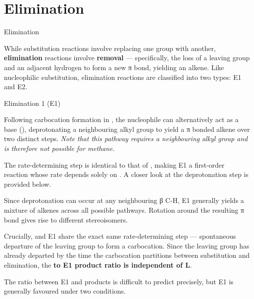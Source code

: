 \documentclass[10pt]{article}
\begin{document}
\section{Elimination}
  
  \begin{core}{Elimination} 

    While substitution reactions involve replacing one group with another, \textbf{elimination} reactions involve \textbf{removal} --- specifically, the loss of a leaving group and an adjacent hydrogen to form a new π bond, yielding an alkene. Like nucleophilic substitution, elimination reactions are classified into two types: E1 and E2.

  \end{core}

  \begin{core}{Elimination 1 (E1)}

    Following carbocation formation in \sno, the nucleophile can alternatively act as a base (), deprotonating a neighbouring alkyl group to yield a π bonded alkene over two distinct steps. \textit{Note that this pathway requires a neighbouring alkyl group and is therefore not possible for methane.}


    The rate-determining step is identical to that of \sno, making E1 a first-order reaction whose rate depends solely on \ce{[R-L]}. A closer look at the deprotonation step is provided below.


    Since deprotonation can occur at any neighbouring β C-H, E1 generally yields a mixture of alkenes across all possible pathways. Rotation around the resulting π bond gives rise to different stereoisomers.


    Crucially, \sno and E1 share the exact same rate-determining step --- spontaneous departure of the leaving group to form a carbocation. Since the leaving group has already departed by the time the carbocation partitions between substitution and elimination, the \textbf{\sno to E1 product ratio is independent of L}.

    The ratio between E1 and \sno products is difficult to predict precisely, but E1 is generally favoured under two conditions.


\end{core}
\end{document}
